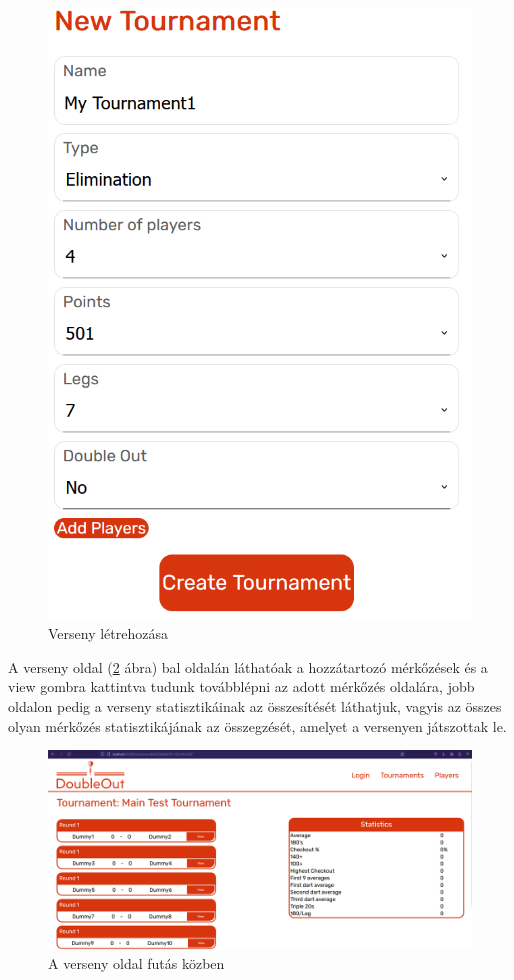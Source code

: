\begin{figure}[h]
\centering
\includegraphics[scale=0.3]{images/NewTournamentTest.png}
\caption{Verseny létrehozása}
\label{fig:newTournamentTest}
\end{figure}

A verseny oldal (\ref{fig:tournamentTest} ábra) bal oldalán láthatóak a hozzátartozó mérkőzések és a view gombra kattintva tudunk továbblépni az adott mérkőzés oldalára, jobb oldalon pedig a verseny statisztikáinak az összesítését láthatjuk, vagyis az összes olyan mérkőzés statisztikájának az összegzését, amelyet a versenyen játszottak le.

\begin{figure}[h]
\centering
\includegraphics[scale=0.3]{images/TournamentTest.png}
\caption{A verseny oldal futás közben}
\label{fig:tournamentTest}
\end{figure}


